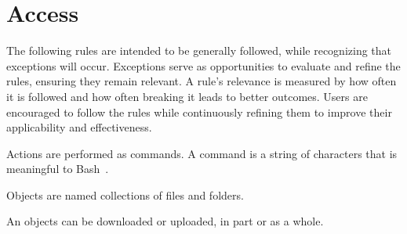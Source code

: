 \section{Access}

\begin{axiom}[Rules]
The following rules are intended to be generally followed, while recognizing that exceptions will occur. Exceptions serve as opportunities to evaluate and refine the rules, ensuring they remain relevant. A rule's relevance is measured by how often it is followed and how often breaking it leads to better outcomes. Users are encouraged to follow the rules while continuously refining them to improve their applicability and effectiveness.
\end{axiom}

\begin{axiom}[Commands]
Actions are performed as commands. A command is a string of characters that is meaningful to Bash~\cite{gnu_bash}.
\end{axiom}

\begin{axiom}[Objects]
Objects are named collections of files and folders.
\end{axiom}

\begin{axiom}
An objects can be downloaded or uploaded, in part or as a whole.
\end{axiom}
    

